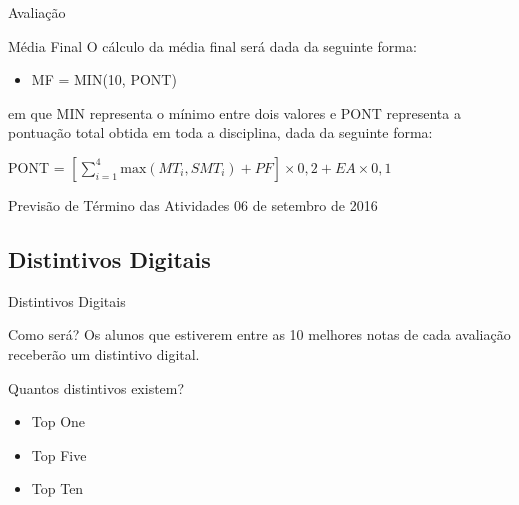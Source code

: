 \documentclass[xcolor=dvipsnames,table]{beamer}
\begin{document}
	\begin{frame}{Avaliação}
		\begin{block}{Média Final}
			O cálculo da média final será dada da seguinte forma:
			\begin{itemize}
				\item MF = MIN(10, PONT)
			\end{itemize}
			em que MIN representa o mínimo entre dois valores e PONT representa a pontuação total obtida em toda a disciplina, dada da seguinte forma:
			\begin{center}
				PONT = $\left[ \sum\limits_{i=1}^{4} \mbox{max}(MT_i, SMT_i) + PF \right] \times 0,2 + EA \times 0,1$
			\end{center}
		\end{block} \pause
		\begin{exampleblock}{Previsão de Término das Atividades}
			06 de setembro de 2016
		\end{exampleblock}
	\end{frame}
	
	\subsection{Distintivos Digitais}
	\begin{frame}{Distintivos Digitais}
		\begin{block}{Como será?}
			Os alunos que estiverem entre as 10 melhores notas de cada avaliação receberão um distintivo digital.
		\end{block} \pause
		\begin{block}{Quantos distintivos existem?}
			\begin{itemize}
				\item {\sc Top One}
				\item {\sc Top Five}
				\item {\sc Top Ten}
			\end{itemize}
		\end{block}
	\end{frame}
	
\end{document}
